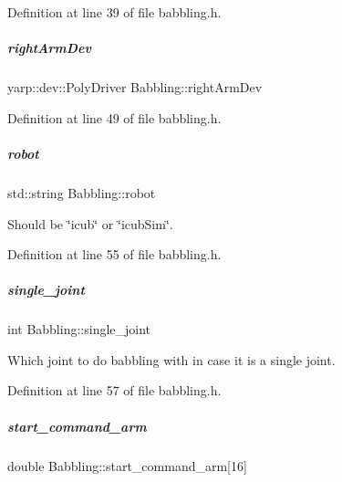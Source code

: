 Definition at line 39 of file babbling.\+h.

\mbox{\label{group__babbling_ab35573fbefffff68d2816c4ce405a0a4}} 
\subparagraph{\texorpdfstring{right\+Arm\+Dev}{rightArmDev}}
{\footnotesize\ttfamily yarp\+::dev\+::\+Poly\+Driver Babbling\+::right\+Arm\+Dev\hspace{0.3cm}{\ttfamily [protected]}}



Definition at line 49 of file babbling.\+h.

\mbox{\label{group__babbling_a9b705ef5f9e677dab59f274c1582c0fc}} 
\subparagraph{\texorpdfstring{robot}{robot}}
{\footnotesize\ttfamily std\+::string Babbling\+::robot\hspace{0.3cm}{\ttfamily [protected]}}



Should be \char`\"{}icub\char`\"{} or \char`\"{}icub\+Sim\char`\"{}. 



Definition at line 55 of file babbling.\+h.

\mbox{\label{group__babbling_a3db3bc9a3171c963c66b268cd8c28f36}} 
\subparagraph{\texorpdfstring{single\+\_\+joint}{single\_joint}}
{\footnotesize\ttfamily int Babbling\+::single\+\_\+joint\hspace{0.3cm}{\ttfamily [protected]}}



Which joint to do babbling with in case it is a single joint. 



Definition at line 57 of file babbling.\+h.

\mbox{\label{group__babbling_a774931f9e0d4b55f143b69c6ddb8c314}} 
\subparagraph{\texorpdfstring{start\+\_\+command\+\_\+arm}{start\_command\_arm}}
{\footnotesize\ttfamily double Babbling\+::start\+\_\+command\+\_\+arm\mbox{[}16\mbox{]}\hspace{0.3cm}{\ttfamily [protected]}}



